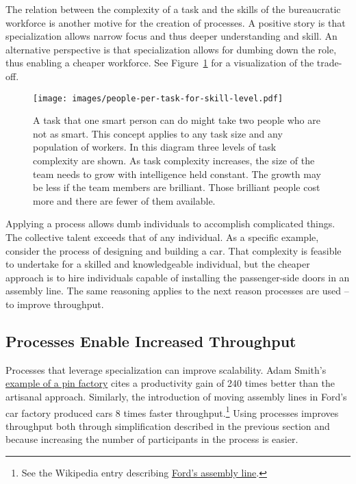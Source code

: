 The relation between the complexity of a task and the skills of the bureaucratic workforce is another motive for the creation of processes.
A positive story is that specialization allows narrow focus and thus deeper understanding and skill. An alternative perspective is that specialization allows for dumbing down the role, thus enabling a cheaper workforce. See Figure~\ref{fig:complexity-and-size}%
\iftoggle{haspagenumbers}{on page~\pageref{fig:complexity-and-size}}{\ }%
for a visualization of the trade-off.

\begin{figure}
\centering
\texttt{[image: images/people-per-task-for-skill-level.pdf]}
\caption{A task that one smart person can do might take two people who are not as smart. This concept applies to any task size and any population of workers. In this diagram three levels of task complexity are shown. As task complexity increases, the size of the team needs to grow with intelligence held constant. The growth may be less if the team members are brilliant. Those brilliant people cost more and there are fewer of them available.}
\label{fig:complexity-and-size}
\end{figure}

Applying a process allows dumb individuals to accomplish complicated things. The collective talent exceeds that of any individual.  As a specific example, consider the process of designing and building a car. That complexity is feasible to undertake for a skilled and knowledgeable individual, but the cheaper approach is to hire individuals capable of installing the passenger-side doors in an assembly line. The same reasoning applies to the next reason processes are used -- to improve throughput.



\subsection*{Processes Enable Increased Throughput}

Processes that leverage specialization can improve scalability. Adam Smith's \href{https://en.wikipedia.org/wiki/Business_process\%23Adam_Smith}{example of a pin factory} cites a productivity gain of 240 times better than the artisanal approach.
Similarly, the introduction of moving assembly lines in Ford's car factory produced cars 8 times faster throughput.\footnote{See the Wikipedia entry describing \href{https://en.wikipedia.org/wiki/Assembly_line\%2320th_century}{Ford's assembly line}.
} Using processes improves throughput both through simplification described in the previous section and because increasing the number of participants in the process is easier.


